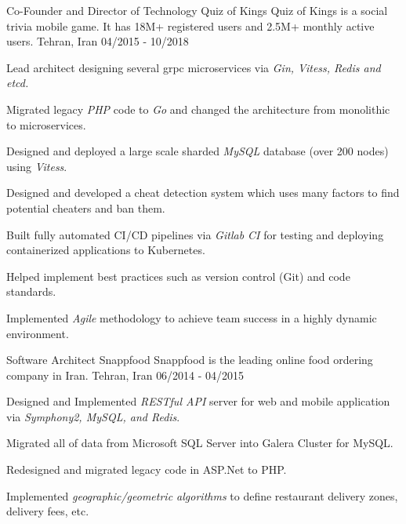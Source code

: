 \begin{cventries}
  \cventry
    {Co-Founder and Director of Technology} %
    {Quiz of Kings} %
    {Quiz of Kings is a social trivia mobile game. It has 18M+ registered users and 2.5M+ monthly active users.}
    {Tehran, Iran} %
    {04/2015 - 10/2018} %
    {
      \begin{cvitems} %
        \item {Lead architect designing several grpc microservices via \emph{Gin, Vitess, Redis and etcd.}}
        \item {Migrated legacy \emph{PHP} code to \emph{Go} and changed the architecture from monolithic to microservices.}
        \item {Designed and deployed a large scale sharded \emph{MySQL} database (over 200 nodes) using \emph{Vitess}.}
        \item {Designed and developed a cheat detection system which uses many factors to find potential cheaters and ban them.}
        \item {Built fully automated CI/CD pipelines via \emph{Gitlab CI} for testing and deploying containerized applications to Kubernetes.}
        \item {Helped implement best practices such as version control (Git) and code standards.}
        \item {Implemented \emph{Agile} methodology to achieve team success in a highly dynamic environment.}
      \end{cvitems}
    }

  \cventry
    {Software Architect} %
    {Snappfood} %
    {Snappfood is the leading online food ordering company in Iran.}
    {Tehran, Iran} %
    {06/2014 - 04/2015} %
    {
      \begin{cvitems} %
        \item {Designed and Implemented \emph{RESTful API} server for web and mobile application via \emph{Symphony2, MySQL, and Redis}.}
        \item {Migrated all of data from Microsoft SQL Server into Galera Cluster for MySQL.}
        \item {Redesigned and migrated legacy code in ASP.Net to PHP.}
        \item {Implemented \emph{geographic/geometric algorithms} to define restaurant delivery zones, delivery fees, etc.}
      \end{cvitems}
    }


\end{cventries}
